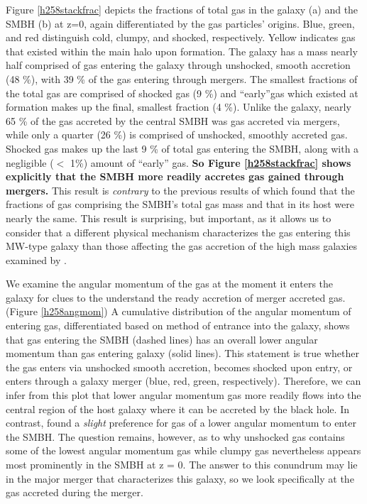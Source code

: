 \documentclass[12pt,headA,chapB]{fiskthesis}
\begin{document}
Figure \ref{h258stackfrac} depicts the fractions of total gas in the galaxy (a) and the SMBH (b) at z=0, again differentiated by the gas particles' origins. Blue, green, and red distinguish cold, clumpy, and shocked, respectively. Yellow indicates gas that existed within the main halo upon formation. The galaxy has a mass nearly half comprised of gas entering the galaxy through unshocked, smooth accretion (48 \%), with 39 \% of the gas entering through mergers. The smallest fractions of the total gas are comprised of shocked gas (9 \%) and ``early''gas which existed at formation makes up the final, smallest fraction (4 \%). Unlike the galaxy, nearly 65 \% of the gas accreted by the central SMBH was gas accreted via mergers, while only a quarter (26 \%) is comprised of unshocked, smoothly accreted gas. Shocked gas makes up the last 9 \% of total gas entering the SMBH, along with a negligible ($<$ 1\%) amount of ``early'' gas. \textbf{So Figure \ref{h258stackfrac} shows explicitly that the SMBH more readily accretes gas gained through mergers.} This result is \textit{contrary} to the previous results of \cite{Bellovary2013} which found that the fractions of gas comprising the SMBH's total gas mass and that in its host were nearly the same. This result is surprising, but important, as it allows us to consider that a different physical mechanism characterizes the gas entering this MW-type galaxy than those affecting the gas accretion of the high mass galaxies examined by \cite{Bellovary2013}. 

We examine the angular momentum of the gas at the moment it enters the galaxy for clues to the understand the ready accretion of merger accreted gas. (Figure \ref{h258angmom}) A cumulative distribution of the angular momentum of entering gas, differentiated based on method of entrance into the galaxy, shows that gas entering the SMBH (dashed lines) has an overall lower angular momentum than gas entering galaxy (solid lines). This statement is true whether the gas enters via unshocked smooth accretion, becomes shocked upon entry, or enters through a galaxy merger (blue, red, green, respectively). Therefore, we can infer from this plot that lower angular momentum gas more readily flows into the central region of the host galaxy where it can be accreted by the black hole. In contrast, \cite{Bellovary2013} found a \textit{slight} preference for gas of a lower angular momentum to enter the SMBH. The question remains, however, as to why unshocked gas contains some of the lowest angular momentum gas while clumpy gas nevertheless appears most prominently in the SMBH at z = 0. The answer to this conundrum may lie in the major merger that characterizes this galaxy, so we look specifically at the gas accreted during the merger. 
\end{document}
